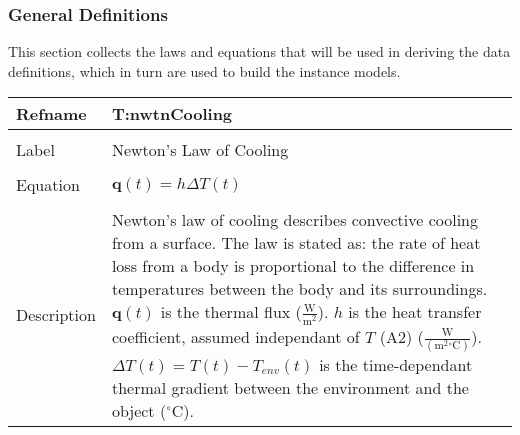 \documentclass[12pt]{article}
\begin{document}
\subsubsection{General Definitions}
\label{Sec:GDs}
This section collects the laws and equations that will be used in deriving the data definitions, which in turn are used to build the instance models.
~\newline
\noindent \begin{minipage}{\textwidth}
\begin{tabular}{p{} p{}}
\toprule \textbf{Refname} & \textbf{T:nwtnCooling}
\label{T:nwtnCooling}
\\ \midrule \\
Label & Newton's Law of Cooling
\\ \midrule \\
Equation & $\mathbf{q}\left(t\right)=h \Delta{}T\left(t\right)$
\\ \midrule \\
Description & Newton's law of cooling describes convective cooling from a surface. The law is stated as: the rate of heat loss from a body is proportional to the difference in temperatures between the body and its surroundings. $\mathbf{q}\left(t\right)$ is the thermal flux ($\frac{\text{W}}{\text{m}^{2}}$). $h$ is the heat transfer coefficient, assumed independant of $T$ (A2) ($\frac{\text{W}}{(\text{m}^{2}{}^{\circ}\text{C})}$). $\Delta{}T\left(t\right)=T\left(t\right)-{T_{env}}\left(t\right)$ is the time-dependant thermal gradient between the environment and the object (${}^{\circ}$C).
\\ \bottomrule \end{tabular}
\end{minipage}\\
~\newline
\end{document}
